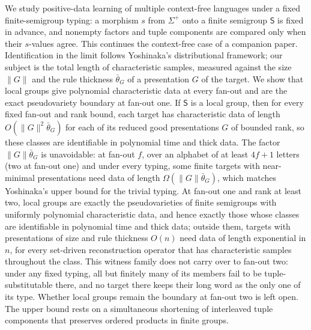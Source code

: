 
We study positive-data learning of multiple context-free languages under a
fixed finite-semigroup typing: a morphism $s$ from $\Sigma^+$ onto a finite
semigroup $\mathsf S$ is fixed in advance, and nonempty factors and tuple
components are compared only when their $s$-values agree.  This continues the
context-free case of a companion paper.  Identification in the limit follows
Yoshinaka's distributional framework; our subject is the total
length of characteristic samples, measured against the size $\|G\|$ and the
rule thickness $\bar\theta_G$ of a presentation $G$ of the target.  We show
that local groups give polynomial characteristic data at every fan-out and are
the exact pseudovariety boundary at fan-out one.  If
$\mathsf S$ is a local group, then for every fixed fan-out and rank bound, each
target has characteristic data of length $O(\|G\|^2\bar\theta_G)$ for each of
its reduced good presentations $G$ of bounded rank, so these classes are
identifiable in polynomial time and thick data.  The factor
$\|G\|\bar\theta_G$ is unavoidable: at fan-out $f$, over an alphabet of at
least $4f+1$ letters (two at fan-out one) and under every typing, some finite
targets with near-minimal presentations need data of length
$\Omega(\|G\|\bar\theta_G)$, which matches Yoshinaka's upper bound for the trivial
typing.  At fan-out one and rank at least two, local groups are exactly the
pseudovarieties of finite semigroups with uniformly polynomial characteristic
data, and hence exactly those whose classes are identifiable in polynomial time
and thick data; outside them, targets with presentations of size and rule
thickness $O(n)$ need data of length exponential in $n$, for every set-driven
reconstruction operator that has characteristic samples throughout the class.  This witness family does not carry over to fan-out two: under any
fixed typing, all but finitely many of its members fail to be
tuple-substitutable there, and no target there keeps their long word as the
only one of its type.  Whether local groups remain the boundary at fan-out two
is left open.  The upper bound rests on a simultaneous shortening of
interleaved tuple components that preserves ordered products in finite groups.

